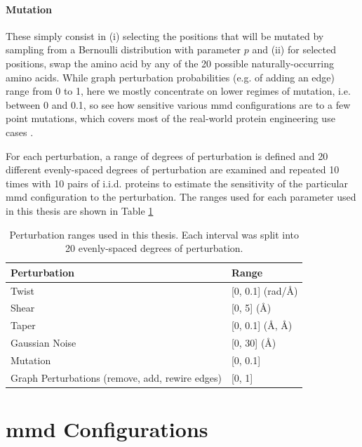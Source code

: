 \paragraph{Mutation} These simply consist in (i) selecting the positions that
will be mutated by sampling from a Bernoulli distribution with parameter $p$ and
(ii) for selected positions, swap the amino acid by any of the 20 possible
naturally-occurring amino acids. While graph perturbation probabilities (e.g. of
adding an edge) range from 0 to 1, here we mostly concentrate on lower regimes
of mutation, i.e. between 0 and 0.1, so see how sensitive various \gls{mmd}
configurations are to a few point mutations, which covers most of the
real-world protein engineering use cases \citep{poluri2017protein}.

For each perturbation, a range of degrees of perturbation is defined and 20
different evenly-spaced degrees of perturbation are examined and repeated 10
times with 10 pairs of i.i.d. proteins to estimate the sensitivity of the
particular \gls{mmd} configuration to the perturbation. The ranges used for each
parameter used in this thesis are shown in Table \ref{tab:perturbation_ranges}


\begin{table}
  \centering
  \begin{tabular}{>{\raggedright\arraybackslash}p{4.8cm}l}
    \toprule
    \textbf{Perturbation} & \textbf{Range} \\
    \midrule
    Twist & [0, 0.1] (rad/\si{\angstrom})\\
    Shear & [0, 5] (\si{\angstrom}) \\
    Taper & [0, 0.1] (\si{\angstrom}, \si{\angstrom}) \\
    Gaussian Noise & [0, 30] (\si{\angstrom}) \\
    Mutation & [0, 0.1]\\
    Graph Perturbations (remove, add, rewire edges) & [0, 1]\\
    \bottomrule
  \end{tabular}
  \caption[Perturbation ranges used in this thesis.]{Perturbation ranges used in this thesis. Each interval was split into
    20 evenly-spaced degrees of perturbation.}
  \label{tab:perturbation_ranges}
\end{table}

\section{\gls{mmd} Configurations}

